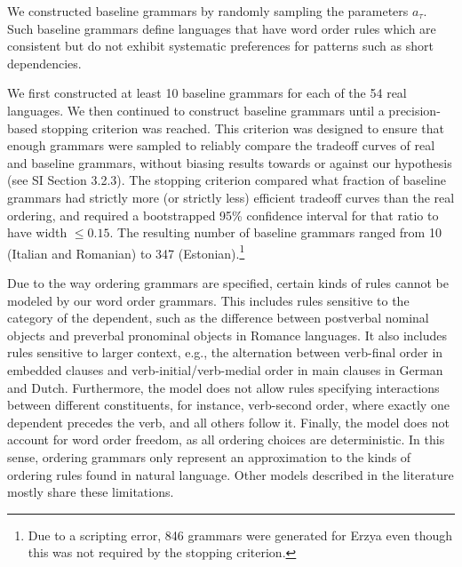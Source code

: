 We constructed baseline grammars by randomly sampling the parameters $a_\tau$.
Such baseline grammars define languages that have word order rules which are consistent but do not exhibit systematic preferences for patterns such as short dependencies.

We first constructed at least 10 baseline grammars for each of the 54 real languages.
We then continued to construct baseline grammars until a precision-based stopping criterion was reached. This criterion was designed to ensure that enough grammars were sampled to reliably compare the tradeoff curves of real and baseline grammars, without biasing results towards or against our hypothesis (see SI Section 3.2.3).
The stopping criterion compared what fraction of baseline grammars had strictly more (or strictly less) efficient tradeoff curves than the real ordering, and required a bootstrapped 95\% confidence interval for that ratio to have width $\leq 0.15$.
The resulting number of baseline grammars ranged from 10 (Italian and Romanian) to 347 (Estonian).\footnote{Due to a scripting error, 846 grammars were generated for Erzya even though this was not required by the stopping criterion.}

Due to the way ordering grammars are specified, certain kinds of rules cannot be modeled by our word order grammars.
This includes rules sensitive to the category of the dependent, such as the difference between postverbal nominal objects and preverbal pronominal objects in Romance languages.
It also includes rules sensitive to larger context, e.g., the alternation between verb-final order in embedded clauses and verb-initial/verb-medial order in main clauses in German and Dutch.
Furthermore, the model does not allow rules specifying interactions between different constituents, for instance, verb-second order, where exactly one dependent precedes the verb, and all others follow it.
Finally, the model does not account for word order freedom, as all ordering choices are deterministic.
In this sense, ordering grammars only represent an approximation to the kinds of ordering rules found in natural language.
Other models described in the literature \citep{futrell2015experiments, wang2016galactic} mostly share these limitations.


